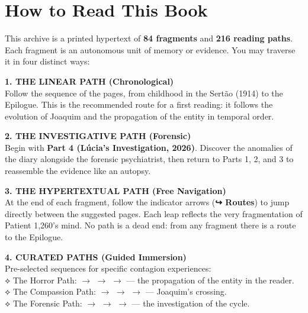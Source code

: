 \cleardoublepage
\thispagestyle{empty}
\chapter*{How to Read This Book}

\begingroup

This archive is a printed hypertext of \textbf{84 fragments} and \textbf{216 reading paths}. Each fragment is an autonomous unit of memory or evidence. You may traverse it in four distinct ways:

\vspace{0.8em}

\noindent\textbf{1. THE LINEAR PATH (Chronological)}\\
\noindent Follow the sequence of the pages, from childhood in the Sertão (1914) to the Epilogue. This is the recommended route for a first reading: it follows the evolution of Joaquim and the propagation of the entity in temporal order.

\vspace{0.5em}

\noindent\textbf{2. THE INVESTIGATIVE PATH (Forensic)}\\
\noindent Begin with \textbf{Part 4 (Lúcia's Investigation, 2026)}. Discover the anomalies of the diary alongside the forensic psychiatrist, then return to Parts 1, 2, and 3 to reassemble the evidence like an autopsy.

\vspace{0.5em}

\noindent\textbf{3. THE HYPERTEXTUAL PATH (Free Navigation)}\\
\noindent At the end of each fragment, follow the indicator arrows (\textbf{↪ Routes}) to jump directly between the suggested pages. Each leap reflects the very fragmentation of Patient 1,260's mind. No path is a dead end: from any fragment there is a route to the Epilogue.

\vspace{0.5em}

\noindent\textbf{4. CURATED PATHS (Guided Immersion)}\\
\noindent Pre-selected sequences for specific contagion experiences:\\[0.3em]
\noindent\textcolor{sangue}{⟡ The Horror Path:}  $\rightarrow$  $\rightarrow$  $\rightarrow$  --- the propagation of the entity in the reader.\\[0.2em]
\noindent\textcolor{sangue}{⟡ The Compassion Path:}  $\rightarrow$  $\rightarrow$  $\rightarrow$  --- Joaquim's crossing.\\[0.2em]
\noindent\textcolor{sangue}{⟡ The Forensic Path:}  $\rightarrow$  $\rightarrow$  $\rightarrow$  --- the investigation of the cycle.

